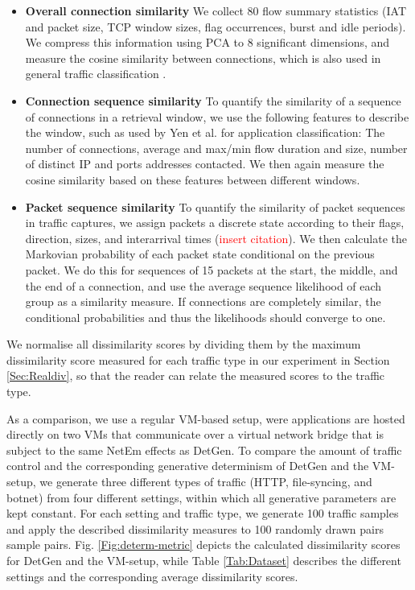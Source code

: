 \documentclass[runningheads]{llncs}
\begin{document}
\begin{itemize}
\item \textbf{Overall connection similarity} We collect 80 flow summary statistics (IAT and packet size, TCP window sizes, flag occurrences, burst and idle periods). We compress this information using PCA to 8 significant dimensions, and measure the cosine similarity between connections, which is also used in general traffic classification \cite{aun2017review}.
\item \textbf{Connection sequence similarity} 
To quantify the similarity of a sequence of connections in a retrieval window, we use the following features to describe the window, such as used by Yen et al. \cite{yen2009browser} for application classification: The number of connections, average and max/min flow duration and size, number of distinct IP and ports addresses contacted. We then again measure the cosine similarity based on these features between different windows. 
\item \textbf{Packet sequence similarity} To quantify the similarity of packet sequences in traffic captures, we assign packets a discrete state according to their flags, direction, sizes, and interarrival times (\textcolor{red}{insert citation}). We then calculate the Markovian probability of each packet state conditional on the previous packet. We do this for sequences of 15 packets at the start, the middle, and the end of a connection, and use the average sequence likelihood of each group as a similarity measure. If connections are completely similar, the conditional probabilities and thus the likelihoods should converge to one.
\end{itemize}

We normalise all dissimilarity scores by dividing them by the maximum dissimilarity score measured for each traffic type in our experiment in Section \ref{Sec:Realdiv}, so that the reader can relate the measured scores to the traffic type.





As a comparison, we use a regular VM-based setup, were applications are hosted directly on two VMs that communicate over a virtual network bridge that is subject to the same NetEm effects as DetGen. To compare the amount of traffic control and the corresponding generative determinism of DetGen and the VM-setup, we generate three different types of traffic (HTTP, file-syncing, and botnet) from four different settings, within which all generative parameters are kept constant. For each setting and traffic type, we generate 100 traffic samples and apply the described dissimilarity measures to 100 randomly drawn pairs sample pairs. Fig. \ref{Fig:determ-metric} depicts the calculated dissimilarity scores for DetGen and the VM-setup, while Table \ref{Tab:Dataset} describes the different settings and the corresponding average dissimilarity scores.
\end{document}
